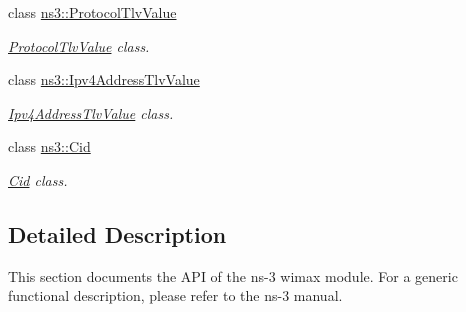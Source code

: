 \begin{DoxyCompactItemize}
class \hyperlink{classns3_1_1ProtocolTlvValue}{ns3\+::\+Protocol\+Tlv\+Value}
\begin{DoxyCompactList}\small\item\em \hyperlink{classns3_1_1ProtocolTlvValue}{Protocol\+Tlv\+Value} class. \end{DoxyCompactList}\item 
class \hyperlink{classns3_1_1Ipv4AddressTlvValue}{ns3\+::\+Ipv4\+Address\+Tlv\+Value}
\begin{DoxyCompactList}\small\item\em \hyperlink{classns3_1_1Ipv4AddressTlvValue}{Ipv4\+Address\+Tlv\+Value} class. \end{DoxyCompactList}\item 
class \hyperlink{classns3_1_1Cid}{ns3\+::\+Cid}
\begin{DoxyCompactList}\small\item\em \hyperlink{classns3_1_1Cid}{Cid} class. \end{DoxyCompactList}\end{DoxyCompactItemize}


\subsection{Detailed Description}
This section documents the A\+PI of the ns-\/3 wimax module. For a generic functional description, please refer to the ns-\/3 manual. 